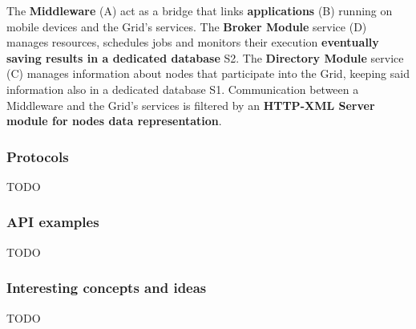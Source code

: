 The \textbf{Middleware} (A) act as a bridge that links \textbf{applications} (B) running on mobile devices and the Grid's services. The \textbf{Broker Module} service (D) manages resources, schedules jobs and monitors their execution \textbf{eventually saving results in a dedicated database} S2. The \textbf{Directory Module} service (C) manages information about nodes that participate into the Grid, keeping said information also in a dedicated database S1.
Communication between a Middleware and the Grid's services is filtered by an \textbf{HTTP-XML Server module for nodes data representation}.

\subsubsection{Protocols}
TODO

\subsubsection{API examples}
TODO

\subsubsection{Interesting concepts and ideas}
TODO